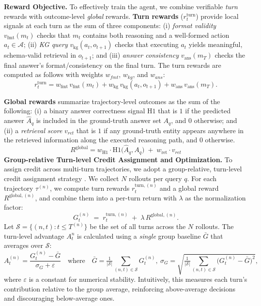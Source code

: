 \noindent\textbf{Reward Objective.} 
\label{subsub:Reward_Function} To effectively train the \framework{} agent, we combine verifiable \emph{turn} rewards with outcome-level \emph{global} rewards. \textbf{Turn rewards} (\(r^{\text{turn}}_{t}\)) provide local signals at each turn as the sum of three components: (i) \emph{format validity} \(v_{\mathrm{fmt}}(m_t)\) checks that \(m_t\) contains both reasoning and a well-formed action \(a_t\in\mathcal{A}\);
(ii) \emph{KG query} \(v_{\mathrm{kg}}(a_t,o_{t+1})\) checks that executing \(a_t\) yields meaningful, schema-valid retrieval in \(o_{t+1}\); and
(iii) \emph{answer consistency} \(v_{\mathrm{ans}}(m_T)\) checks the final answer’s format/consistency on the final turn. The turn rewards are computed as follows with weights $w_{fmt}$, $w_{kg}$, and $w_{ans}$: 
\begin{equation}
r^{\mathrm{turn}}_{t}
= w_{\mathrm{fmt}}\,v_{\mathrm{fmt}}(m_t)
+ w_{\mathrm{kg}}\,v_{\mathrm{kg}}(a_t,o_{t+1})
+ w_{\mathrm{ans}}\,v_{\mathrm{ans}}(m_T).
\end{equation}

\textbf{Global rewards} summarize trajectory-level outcomes as the sum of the following:
(i) a binary answer correctness signal $\mathrm{H1}$ that is $1$ if the predicted answer \(\hat{A}_q\) is included in the ground-truth answer set \(A_q\), and $0$ otherwise; and
(ii) a \emph{retrieval score} $v_{ret}$ that is \(1\) if any ground-truth entity appears anywhere in the retrieved information along the executed reasoning path, and \(0\) otherwise. 
\begin{equation}
R^{\mathrm{global}}
= w_{\mathrm{H1}}\cdot \mathrm{H1}\!\bigl(\hat{A}_q, A_q\bigr)
\;+\;
w_{\mathrm{ret}}\cdot v_{ret}
\end{equation}
\noindent\textbf{Group-relative Turn-level Credit Assignment and Optimization.} \label{subsub:rl_algo}
To assign credit across multi-turn trajectories, we adopt a group-relative, turn-level credit assignment strategy \cite{zeng2025reinforcing}. 
We collect $N$ rollouts per query $q$. For each trajectory $\tau^{(n)}$, we compute turn rewards $r^{\mathrm{turn},(n)}_t$ and a global reward $R^{\mathrm{global},(n)}$, and combine them into a per-turn return with $\lambda$ as the normalization factor:
\begin{equation}
G_t^{(n)} \;=\; r^{\mathrm{turn},(n)}_t \;+\; \lambda\,R^{\mathrm{global},(n)}.
\end{equation}
Let $\mathcal{S} \!=\! \{(n,t)\!:\! t \le T^{(n)}\}$ be the set of all turns across the $N$ rollouts. The turn-level advantage $A_t^{n}$ is calculated using a \emph{single} group baseline $\bar{G}$ that averages over $\mathcal{S}$:
\[
A_t^{(n)}=\frac{G_t^{(n)}-\bar G}{\sigma_G+\varepsilon}
\quad\text{where}\quad
\bar G=\tfrac{1}{|\mathcal S|}\!\sum_{(n,t)\in\mathcal S} G_t^{(n)},\ 
\sigma_G=\sqrt{\tfrac{1}{|\mathcal S|}\!\sum_{(n,t)\in\mathcal S}\!\big(G_t^{(n)}-\bar G\big)^2},
\]
where $\varepsilon$ is a constant for numerical stability. Intuitively, this measures each turn's contribution relative to the group average, reinforcing above-average decisions and discouraging below-average ones.

